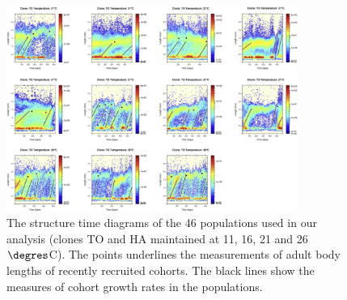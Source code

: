 \begin{figure}
  \ContinuedFloat 
  \centering 
  \includegraphics[width=0.85\textwidth]{5_ChapExp3/fig/FigS2-4}
  \caption[]{
  The structure time diagrams of the 46 populations used in our analysis (clones
  TO and HA maintained at 11, 16, 21 and 26$\degres$C). The points underlines the
  measurements of adult body lengths of recently recruited cohorts. The black
  lines show the measures of cohort growth rates in the populations.}
  \label{Fig5-S2}
\end{figure}